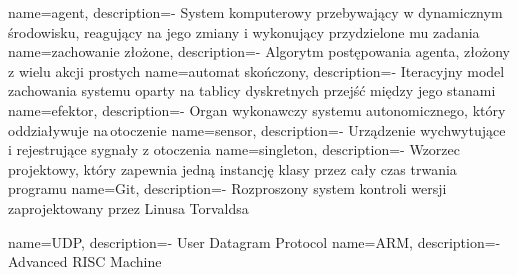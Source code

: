  {name=agent, description={- System komputerowy przebywający w dynamicznym środowisku, reagujący na jego zmiany i wykonujący przydzielone mu zadania}}
 {name=zachowanie złożone, description={- Algorytm postępowania agenta, złożony z wielu akcji prostych}}
 {name=automat skończony, description={- Iteracyjny model zachowania systemu oparty na tablicy dyskretnych przejść między jego stanami}}
 {name=efektor, description={- Organ wykonawczy systemu autonomicznego, który oddziaływuje na\,otoczenie}}
 {name=sensor, description={- Urządzenie wychwytujące i rejestrujące sygnały z otoczenia}}
 {name=singleton, description={- Wzorzec projektowy, który zapewnia jedną instancję klasy przez cały czas trwania programu}}
 {name=Git, description={- Rozproszony system kontroli wersji zaprojektowany przez Linusa Torvaldsa}}

 {name=UDP, description={- User Datagram Protocol}}
 {name=ARM, description={- Advanced RISC Machine}}
